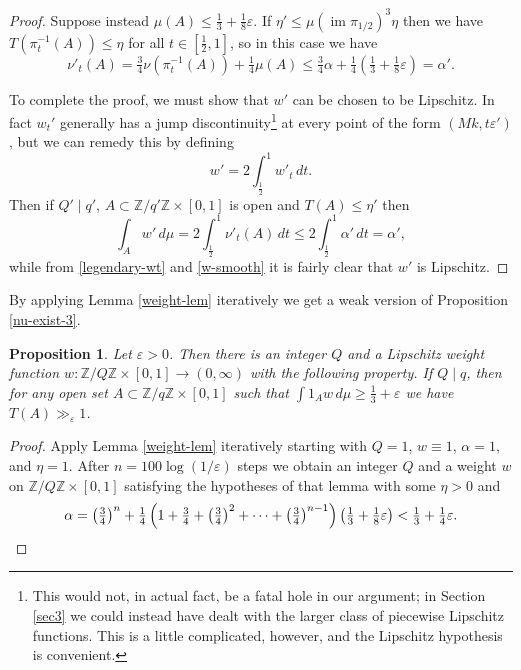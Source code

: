\documentclass[10pt,reqno]{amsart}
\newtheorem{proposition}[theorem]{Proposition}
\theoremstyle{definition}
\theoremstyle{remark}
\renewcommand{\leq}{\leqslant}
\renewcommand{\geq}{\geqslant}
\newcommand\im{\operatorname{im}}
\def\Z{\mathbb{Z}}
\def\eps{\varepsilon}
\numberwithin{equation}{section}
\begin{document}
\begin{proof}
Suppose instead $\mu(A)\leq\frac{1}{3}+\frac{1}{8}\eps$. If $\eta'\leq\mu(\im \pi_{1/2})^3\eta$ then we have $T(\pi_t^{-1}(A)) \leq \eta$ for all $t \in [\frac{1}{2}, 1]$, so in this case we have \[ \nu'_t(A) = \tfrac{3}{4} \nu(\pi_t^{-1}(A)) + \tfrac{1}{4}\mu(A) \leq \tfrac{3}{4}\alpha + \tfrac{1}{4}\left(\tfrac{1}{3} + \tfrac{1}{8}\eps\right) = \alpha'.\]

To complete the proof, we must show that $w'$ can be chosen to be Lipschitz. In fact $w_t'$ generally has a jump discontinuity\footnote{This would not, in actual fact, be a fatal hole in our argument; in Section \ref{sec3} we could instead have dealt with the larger class of piecewise Lipschitz functions. This is a little complicated, however, and the Lipschitz hypothesis is convenient.} at every point of the form $(Mk,t\eps')$, but we can remedy this by defining \begin{equation}\label{w-smooth} w' = 2\int_\frac{1}{2}^1 w'_t\,dt.\end{equation} Then if $Q'\mid q'$, $A\subset\Z/q'\Z\times[0,1]$ is open and $T(A)\leq\eta'$ then \[\int_A w'\,d\mu = 2\int_\frac{1}{2}^1 \nu'_t(A)\,dt \leq 2\int_\frac{1}{2}^1 \alpha'\,dt = \alpha',\]
while from \eqref{legendary-wt} and \eqref{w-smooth} it is fairly clear that $w'$ is Lipschitz.
\end{proof}

By applying Lemma \ref{weight-lem} iteratively we get a weak version of Proposition \ref{nu-exist-3}.

\begin{proposition}\label{nu-exist-weak}
Let $\eps > 0$. Then there is an integer $Q$ and a Lipschitz weight function $w : \Z/Q\Z \times [0,1] \to (0,\infty)$ with the following property. If $Q\mid q$, then for any open set $A\subset\Z/q\Z\times[0,1]$ such that $\int 1_A w\,d\mu\geq\tfrac{1}{3}+\eps$ we have $T(A)\gg_\eps 1$.
\end{proposition}
\begin{proof} Apply Lemma \ref{weight-lem} iteratively starting with $Q=1$, $w \equiv 1$, $\alpha = 1$, and $\eta = 1$. After $n = 100\log(1/\eps)$ steps we obtain an integer $Q$ and a weight $w$ on $\Z/Q\Z \times [0,1]$ satisfying the hypotheses of that lemma with some $\eta>0$ and \[ \alpha = \left(\tfrac{3}{4}\right)^n + \tfrac{1}{4}\left(1 + \tfrac{3}{4} + \left(\tfrac{3}{4}\right)^2 + \dots + \left(\tfrac{3}{4}\right)^{n-1} \right) \left(\tfrac{1}{3} + \tfrac{1}{8}\eps\right) < \tfrac{1}{3} + \tfrac{1}{4}\eps.\qedhere\]
\end{proof}
\end{document}
